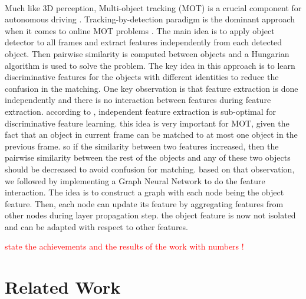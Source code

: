 \documentclass[10pt,twocolumn,letterpaper]{article}
\newcommand\myworries[1]{\textcolor{red}{#1}}
\begin{document}
\paragraph{}
Much like 3D perception, Multi-object tracking (MOT) is a crucial component for autonomous driving \cite{luo2018fast}. Tracking-by-detection paradigm is the dominant approach when it comes to online MOT problems \cite{bewley2016simple, weng2019baseline}. The main idea is to apply object detector to all frames and extract features independently from each detected object. Then pairwise similarity is computed between objects and a Hungarian algorithm \cite{kuhn1955hungarian} is used to solve the problem. The key idea in this approach is to learn discriminative features for the objects with different identities to reduce the confusion in the matching. One key observation is that feature extraction is done independently and there is no interaction between features during feature extraction. according to \cite{weng2020gnn3dmot}, independent feature extraction is sub-optimal for discriminative feature learning. this idea is very important for MOT, given the fact that an object in current frame can be matched to at most one object in the previous frame. so if the similarity between two features increased, then the pairwise similarity between the rest of the objects and any of these two objects should be decreased to avoid confusion for matching. based on that observation, we followed \cite{weng2020gnn3dmot} by implementing a Graph Neural Network to do the feature interaction. The idea is to construct a graph with each node being the object feature. Then, each node can update its feature by aggregating features from other nodes during layer propagation step. the object feature is now not isolated and can be adapted with respect to other features.

\myworries{state the achievements and the results of the work with numbers !}

\section{Related Work}
\end{document}
